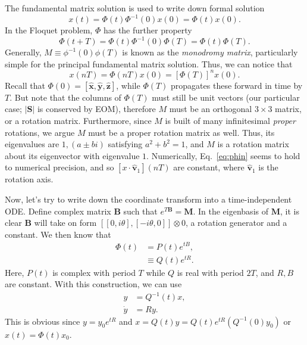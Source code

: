 \documentclass[11pt,
        usenames, %
        dvipsnames %
    ]{article}
\newcommand*{\bm}[1]{\boldsymbol{\mathbf{#1}}}
\newcommand*{\uv}[1]{\hat{\bm{#1}}}
\newcommand*{\abs}[1]{\left|#1\right|}
\newcommand*{\s}[1]{\left[#1\right]}
\begin{document}
The fundamental matrix solution is used to write down formal solution
\begin{equation}
    x(t) = \Phi(t) \Phi^{-1}(0) x(0) = \Phi(t) x(0).
\end{equation}
In the Floquet problem, $\Phi$ has the further property
\begin{equation}
    \Phi(t + T) = \Phi(t) \Phi^{-1}(0) \Phi(T) = \Phi(t) \Phi(T).
\end{equation}
Generally, $M \equiv \phi^{-1}(0) \phi(T)$ is known as the \emph{monodromy
matrix}, particularly simple for the principal fundamental matrix solution.
Thus, we can notice that
\begin{equation}
    x(nT) = \Phi(nT) x(0) = \s{\Phi(T)}^{n} x(0).\label{eq:phin}
\end{equation}
Recall that $\Phi(0) = [\uv{x}, \uv{y}, \uv{z}]$, while $\Phi(T)$ propagates
these forward in time by $T$. But note that the columns of $\Phi(T)$ must still
be unit vectors (our particular case; $\abs{\bm{S}}$ is conserved by EOM),
therefore $M$ must be an orthogonal $3 \times 3$ matrix, or a rotation matrix.
Furthermore, since $M$ is built of many infinitesimal \emph{proper} rotations,
we argue $M$ must be a proper rotation matrix as well. Thus, its eigenvalues are
$1, (a \pm bi)$ satisfying $a^2 + b^2 = 1$, and $M$ is a rotation matrix about
its eigenvector with eigenvalue $1$. Numerically, Eq.~\eqref{eq:phin} seems to
hold to numerical precision, and so $[x \cdot \uv{v}_1](nT)$ are constant, where
$\uv{v}_1$ is the rotation axis.

Now, let's try to write down the coordinate transform into a time-independent
ODE\@. Define complex matrix $\bm{B}$ such that $e^{T \bm{B}} = \bm{M}$. In the
eigenbasis of $\bm{M}$, it is clear $\bm{B}$ will take on form $[[0, i\theta],
[-i\theta, 0]] \otimes 0$, a rotation generator and a constant. We then know
that
\begin{align}
    \Phi(t) &= P(t) e^{tB},\\
        &\equiv Q(t) e^{tR}.
\end{align}
Here, $P(t)$ is complex with period $T$ while $Q$ is real with period $2T$, and
$R, B$ are constant. With this construction, we can use
\begin{align}
    y &= Q^{-1}(t) x,\\
    \dot{y} &= Ry.
\end{align}
This is obvious since $y = y_0e^{tR}$ and $x = Q(t)y = Q(t)e^{tR}(Q^{-1}(0)y_0
)$ or $x(t) = \Phi(t) x_0$.
\end{document}
